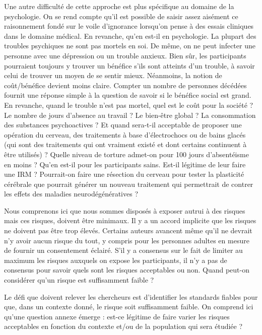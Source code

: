 \documentclass[
  12pt,
]{book}
\begin{document}
Une autre difficulté de cette approche est plus spécifique au domaine de la psychologie. On se rend compte qu'il est possible de saisir assez aisément ce raisonnement fondé sur le voile d'ignorance lorsqu'on pense à des essais cliniques dans le domaine médical. En revanche, qu'en est-il en psychologie. La plupart des troubles psychiques ne sont pas mortels en soi. De même, on ne peut infecter une personne avec une dépression ou un trouble anxieux. Bien sûr, les participants pourraient toujours y trouver un bénéfice s'ils sont atteints d'un trouble, à savoir celui de trouver un moyen de se sentir mieux. Néanmoins, la notion de coût/bénéfice devient moins claire. Compter un nombre de personnes décédées fournit une réponse simple à la question de savoir si le bénéfice social est grand. En revanche, quand le trouble n'est pas mortel, quel est le coût pour la société ? Le nombre de jours d'absence au travail ? Le bien-être global ? La consommation des substances psychoactives ? Et quand sera-t-il acceptable de proposer une opération du cerveau, des traitements à base d'électrochocs ou de bains glacés (qui sont des traitements qui ont vraiment existé et dont certains continuent à être utilisés) ? Quelle niveau de torture admet-on pour 100 jours d'absentéisme en moins ? Qu'en est-il pour les participants sains. Est-il légitime de leur faire une IRM ? Pourrait-on faire une résection du cerveau pour tester la plasticité cérébrale que pourrait générer un nouveau traitement qui permettrait de contrer les effets des maladies neurodégénératives ?

Nous comprenons ici que nous sommes disposés à exposer autrui à des risques mais ces risques, doivent être minimaux. Il y a un accord implicite que les risques ne doivent pas être trop élevés. Certains auteurs avancent même qu'il ne devrait n'y avoir aucun risque du tout, y compris pour les personnes adultes en mesure de fournir un consentement éclairé. S'il y a consensus sur le fait de limiter au maximum les risques auxquels on expose les participants, il n'y a pas de consensus pour savoir quels sont les risques acceptables ou non. Quand peut-on considérer qu'un risque est suffisamment faible ?

Le défi que doivent relever les chercheurs est d'identifier les standards fiables pour que, dans un contexte donné, le risque soit suffisamment faible. On comprend ici qu'une question annexe émerge : est-ce légitime de faire varier les risques acceptables en fonction du contexte et/ou de la population qui sera étudiée ?
\end{document}
